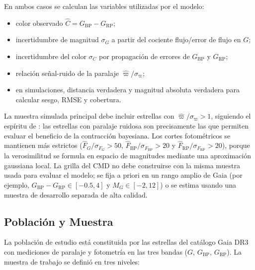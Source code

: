 \documentclass[stu, 12pt, letterpaper, donotrepeattitle, floatsintext, natbib]{apa7_ula}
\begin{document}
En ambos casos se calculan las variables utilizadas por el modelo:
\begin{itemize}
    \item color observado $\hat{C}=G_{\mathrm{BP}}-G_{\mathrm{RP}}$;
    \item incertidumbre de magnitud $\sigma_G$ a partir del cociente
    flujo/error de flujo en $G$;
    \item incertidumbre del color $\sigma_C$ por propagación de errores
    de $G_{\mathrm{BP}}$ y $G_{\mathrm{RP}}$;
    \item relación señal-ruido de la paralaje
    $\hat{\varpi}/\sigma_{\varpi}$;
    \item en simulaciones, distancia verdadera y magnitud absoluta
    verdadera para calcular sesgo, RMSE y cobertura.
\end{itemize}

La muestra simulada principal debe incluir estrellas con
$\hat{\varpi}/\sigma_{\varpi}>1$, siguiendo el espíritu de
\citet{Leistedt_2017}: las estrellas con paralaje ruidosa son
precisamente las que permiten evaluar el beneficio de la contracción
bayesiana. Los cortes fotométricos se mantienen más estrictos
($\hat{F}_G/\sigma_{F_G}>50$,
$\hat{F}_{\mathrm{BP}}/\sigma_{F_{\mathrm{BP}}}>20$ y
$\hat{F}_{\mathrm{RP}}/\sigma_{F_{\mathrm{RP}}}>20$), porque la
verosimilitud se formula en espacio de magnitudes mediante una
aproximación gaussiana local. La grilla del CMD no debe construirse
con la misma muestra usada para evaluar el modelo; se fija a priori en
un rango amplio de Gaia (por ejemplo, $G_{\mathrm{BP}}-G_{\mathrm{RP}}\in
[-0.5,4]$ y $M_G\in[-2,12]$) o se estima usando una muestra de
desarrollo separada de alta calidad.

\subsection{Población y Muestra}

La población de estudio está constituida por las estrellas del
catálogo Gaia DR3 con mediciones de paralaje y fotometría en las
tres bandas ($G$, $G_{\text{BP}}$, $G_{\text{RP}}$). La muestra
de trabajo se definió en tres niveles:
\end{document}
